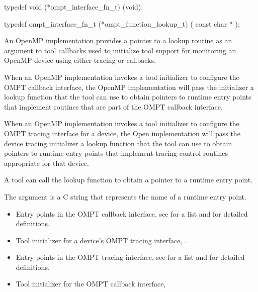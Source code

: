 \format

\begin{ccppspecific}
\begin{omptInquiry}
typedef void (*ompt_interface_fn_t) (void);

typedef ompt_interface_fn_t (*ompt_function_lookup_t) (
  const char *
);
\end{omptInquiry}
\end{ccppspecific}


\descr

An OpenMP implementation provides a pointer to a lookup routine as an
argument to tool callbacks used to initialize tool support for
monitoring an OpenMP device using either tracing or callbacks.



When an OpenMP implementation invokes a tool initializer to configure
the OMPT callback interface, the OpenMP implementation will pass the
initializer a lookup function that the tool can use to obtain
pointers to runtime entry points that implement routines that are part of
the OMPT callback interface.

When an OpenMP implementation invokes a tool initializer to configure
the OMPT tracing interface for a device, the Open implementation will
pass the device tracing initializer a lookup function that the tool
can use to obtain pointers to runtime entry points that implement
tracing control routines appropriate for that device.

A tool can call the lookup function to obtain a pointer to a runtime
entry point.

\argdesc
The argument  is a C string
that represents the name of a runtime entry point.

\crossreferences
\begin{itemize}
\item Entry points in the OMPT callback interface, see
   for a list and
   for detailed definitions.
\item Tool initializer for a device's OMPT tracing interface, .
\item Entry points in the OMPT tracing interface, see
   for a list and
   for detailed definitions.
\item Tool initializer for the OMPT callback interface, 
\end{itemize}
